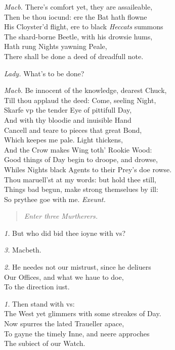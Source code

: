 \documentclass[12pt]{sides}
\newcommand{\StageDir}[1]{\begin{quote}\centering\em #1\end{quote}}
\newcommand{\clStageDir}[1]{\hspace*{\fill}\textit{#1}\hspace*{\fill}}
\newcommand{\dia}[1]{\hskip 15pt\textit{#1}\hskip 6pt}
\begin{document}
\begin{multicols}{2}
            \dia{Macb.} There's comfort yet, they are assaileable, \\ Then be thou iocund: ere the Bat hath flowne \\ His Cloyster'd flight, ere to black \textit{Heccats} summons \\ The shard-borne Beetle, with his drowsie hums, \\ Hath rung Nights yawning Peale, \\ There shall be done a deed of dreadfull note.

            \dia{Lady.} What's to be done?

            \dia{Macb.} Be innocent of the knowledge, dearest Chuck, \\ Till thou applaud the deed: Come, seeling Night, \\ Skarfe vp the tender Eye of pittifull Day, \\ And with thy bloodie and inuisible Hand \\ Cancell and teare to pieces that great Bond, \\ Which keepes me pale. Light thickens, \\ And the Crow makes Wing toth' Rookie Wood: \\ Good things of Day begin to droope, and drowse, \\ Whiles Nights black Agents to their Prey's doe rowse. \\ Thou maruell'st at my words: but hold thee still, \\ Things bad begun, make strong themselues by ill: \\ So prythee goe with me. \clStageDir{Exeunt.}
            \StageDir{Enter three Murtherers.}
            \dia{1.} But who did bid thee ioyne with vs?

            \dia{3.} Macbeth.

            \dia{2.} He needes not our mistrust, since he deliuers \\ Our Offices, and what we haue to doe, \\ To the direction iust.

            \dia{1.} Then stand with vs: \\ The West yet glimmers with some streakes of Day. \\ Now spurres the lated Traueller apace, \\ To gayne the timely Inne, and neere approches \\ The subiect of our Watch.


\end{multicols}
\end{document}
